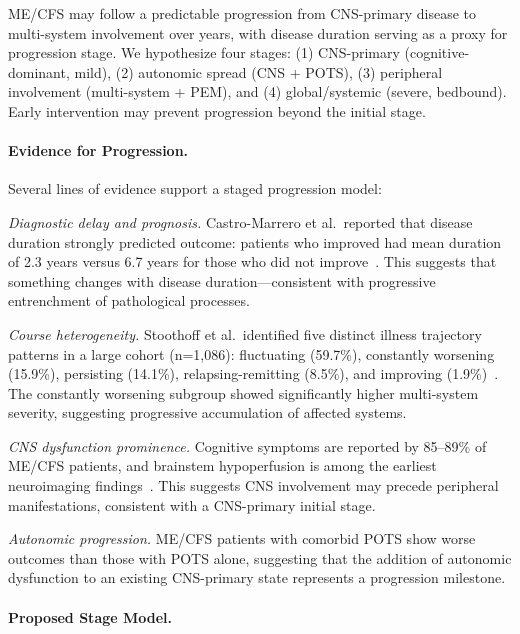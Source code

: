 \begin{hypothesis}
\label{hyp:disease-stage-progression}

ME/CFS may follow a predictable progression from CNS-primary disease to multi-system involvement over years, with disease duration serving as a proxy for progression stage. We hypothesize four stages: (1) CNS-primary (cognitive-dominant, mild), (2) autonomic spread (CNS + POTS), (3) peripheral involvement (multi-system + PEM), and (4) global/systemic (severe, bedbound). Early intervention may prevent progression beyond the initial stage.

\paragraph{Evidence for Progression.}
Several lines of evidence support a staged progression model:

\textit{Diagnostic delay and prognosis.} Castro-Marrero et al.\ reported that disease duration strongly predicted outcome: patients who improved had mean duration of 2.3 years versus 6.7 years for those who did not improve~\cite{CastroMarrero2022prognosis}. This suggests that something changes with disease duration---consistent with progressive entrenchment of pathological processes.

\textit{Course heterogeneity.} Stoothoff et al.\ identified five distinct illness trajectory patterns in a large cohort (n=1,086): fluctuating (59.7\%), constantly worsening (15.9\%), persisting (14.1\%), relapsing-remitting (8.5\%), and improving (1.9\%)~\cite{Stoothoff2017subtypes}. The constantly worsening subgroup showed significantly higher multi-system severity, suggesting progressive accumulation of affected systems.

\textit{CNS dysfunction prominence.} Cognitive symptoms are reported by 85--89\% of ME/CFS patients, and brainstem hypoperfusion is among the earliest neuroimaging findings~\cite{pmc11899462cog}. This suggests CNS involvement may precede peripheral manifestations, consistent with a CNS-primary initial stage.

\textit{Autonomic progression.} ME/CFS patients with comorbid POTS show worse outcomes than those with POTS alone, suggesting that the addition of autonomic dysfunction to an existing CNS-primary state represents a progression milestone.

\paragraph{Proposed Stage Model.}


\end{hypothesis}
